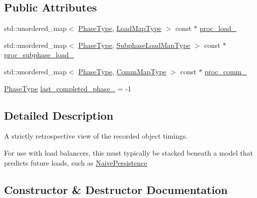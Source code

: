 \subsection*{Public Attributes}
\begin{DoxyCompactItemize}
\item 
std\+::unordered\+\_\+map$<$ \hyperlink{namespacevt_a46ce6733d5cdbd735d561b7b4029f6d7}{Phase\+Type}, \hyperlink{namespacevt_1_1vrt_1_1collection_1_1balance_a45306ee4bf38fe3fb586d1ee2fa3d147}{Load\+Map\+Type} $>$ const  $\ast$ \hyperlink{structvt_1_1vrt_1_1collection_1_1balance_1_1_raw_data_a8ba841120376e38c83484365b57fc719}{proc\+\_\+load\+\_\+}
\item 
std\+::unordered\+\_\+map$<$ \hyperlink{namespacevt_a46ce6733d5cdbd735d561b7b4029f6d7}{Phase\+Type}, \hyperlink{namespacevt_1_1vrt_1_1collection_1_1balance_a3d91523158c1025b7b665240072f3b7e}{Subphase\+Load\+Map\+Type} $>$ const  $\ast$ \hyperlink{structvt_1_1vrt_1_1collection_1_1balance_1_1_raw_data_afc0c2273b3e7987e386c5d1b77289413}{proc\+\_\+subphase\+\_\+load\+\_\+}
\item 
std\+::unordered\+\_\+map$<$ \hyperlink{namespacevt_a46ce6733d5cdbd735d561b7b4029f6d7}{Phase\+Type}, \hyperlink{namespacevt_1_1vrt_1_1collection_1_1balance_a10860c956804d644db54a16012352728}{Comm\+Map\+Type} $>$ const  $\ast$ \hyperlink{structvt_1_1vrt_1_1collection_1_1balance_1_1_raw_data_a1e350ebf1bd9b3c94fdbc371779b8832}{proc\+\_\+comm\+\_\+}
\item 
\hyperlink{namespacevt_a46ce6733d5cdbd735d561b7b4029f6d7}{Phase\+Type} \hyperlink{structvt_1_1vrt_1_1collection_1_1balance_1_1_raw_data_a9ceb9cf1dd88772821658e506d015397}{last\+\_\+completed\+\_\+phase\+\_\+} = -\/1
\end{DoxyCompactItemize}


\subsection{Detailed Description}
A strictly retrospective view of the recorded object timings. 

For use with load balancers, this must typically be stacked beneath a model that predicts future loads, such as \hyperlink{structvt_1_1vrt_1_1collection_1_1balance_1_1_naive_persistence}{Naive\+Persistence} 

\subsection{Constructor \& Destructor Documentation}
\mbox{\label{structvt_1_1vrt_1_1collection_1_1balance_1_1_raw_data_a4879ed47b7d3da3008dc6199adc6d519}} 
